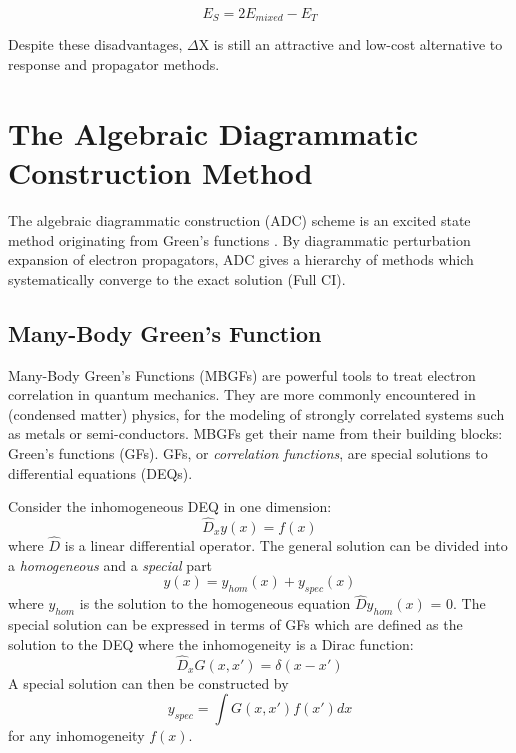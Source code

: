 \begin{equation}
E_S = 2 E_{mixed} - E_T
\end{equation}

Despite these disadvantages, $\Delta$X is still an attractive and low-cost alternative to response and propagator methods.


\section{The Algebraic Diagrammatic Construction Method}

The algebraic diagrammatic construction (ADC) scheme is an excited state method originating from Green's functions \cite{Sch1982,Sch2018}. By diagrammatic perturbation expansion of electron propagators, ADC gives a hierarchy of methods which systematically converge to the exact solution (Full CI).  

\subsection{Many-Body Green's Function}

Many-Body Green's Functions (MBGFs) are powerful tools to treat electron correlation in quantum mechanics. They are more commonly encountered in (condensed matter) physics, for the modeling of strongly correlated systems such as metals or semi-conductors. MBGFs get their name from their building blocks: Green's functions (GFs). GFs, or \emph{correlation functions}, are special solutions to differential equations (DEQs).

Consider the inhomogeneous DEQ in one dimension:
\begin{equation}
\hat{D}_x y(x) = f(x)
\end{equation}
\noindent where $\hat{D}$ is a linear differential operator. The general solution can be divided into a \emph{homogeneous} and a \emph{special} part
\begin{equation}
y(x) = y_{hom}(x) + y_{spec}(x)
\end{equation}
\noindent where $y_{hom}$ is the solution to the homogeneous equation $\hat{D}y_{hom}(x)$ = 0. The special solution can be expressed in terms of GFs which are defined as the solution to the DEQ where the inhomogeneity is a Dirac function:
\begin{equation}
\hat{D}_x G(x,x') = \delta(x-x')
\end{equation}
\noindent A special solution can then be constructed by
\begin{equation}
y_{spec} = \int G(x,x')f(x') dx
\end{equation}
\noindent for any inhomogeneity $f(x)$. 

